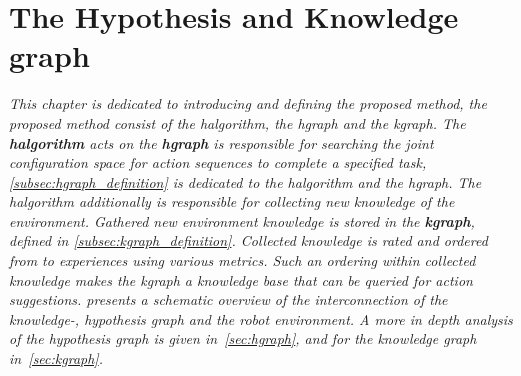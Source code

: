 \chapter{The Hypothesis and Knowledge graph}%
\label{chap:hgraph_and_kgraph}

\textit{This chapter is dedicated to introducing and defining the proposed method, the proposed method consist of the \acl{halgorithm}, the \acl{hgraph} and the \acl{kgraph}. The \textbf{\acl{halgorithm}} acts on the \textbf{\acl{hgraph}} is responsible for searching the joint configuration space for action sequences to complete a specified task, \cref{subsec:hgraph_definition} is dedicated to the \ac{halgorithm} and the \ac{hgraph}. The \ac{halgorithm} additionally is responsible for collecting new knowledge of the environment. Gathered new environment knowledge is stored in the \textbf{\acl{kgraph}}, defined in \cref{subsec:kgraph_definition}. Collected knowledge is rated and ordered from  to  experiences using various metrics. Such an ordering within collected knowledge makes the \ac{kgraph} a knowledge base that can be queried for action suggestions.  presents a schematic overview of the interconnection of the knowledge-, hypothesis graph and the robot environment. A more in depth analysis of the hypothesis graph is given in~\cref{sec:hgraph}, and for the knowledge graph in~\cref{sec:kgraph}.}

